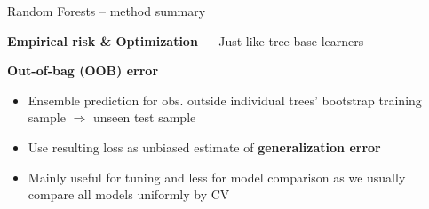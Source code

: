 \documentclass[11pt,compress,t,notes=noshow, xcolor=table]{beamer}
\newcommand{\highlight}[1]{\textcolor{hlcol}{\textbf{#1}}}
\begin{document}
\begin{frame2}{Random Forests -- method summary}




\highlight{Empirical risk \& Optimization} ~~ Just like tree base learners


\highlight{Out-of-bag (OOB) error}
\begin{itemize}
  \item Ensemble prediction for obs. outside individual trees' bootstrap training sample $\Rightarrow$ unseen test sample
  \item Use resulting loss as unbiased estimate of \textbf{generalization error}
  \item Mainly useful for tuning and less for model comparison as we usually compare all models uniformly by CV
\end{itemize}

\end{frame2}
\end{document}
